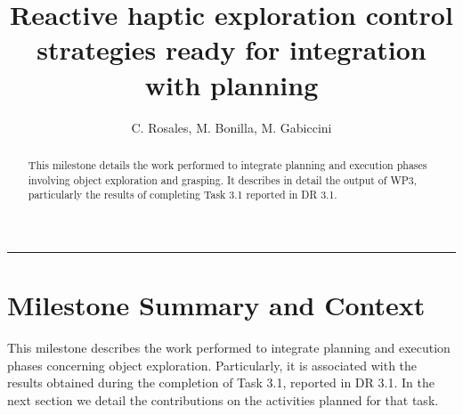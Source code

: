 \documentclass[a4paper,11pt,pdf]{pacmanreport}
\title{Reactive haptic exploration control strategies ready for integration with planning}
\author{C. Rosales, M. Bonilla, M. Gabiccini}
\begin{document}
\maketitle

\begin{abstract}
\noindent This milestone details the work performed to integrate planning and execution phases involving object exploration and grasping. It describes in detail the output of WP3, particularly the results of completing Task 3.1 reported in DR 3.1.
\end{abstract}


\vspace{.2em}
\hrule

\vspace{.2em}
\footnotesize

\tableofcontents

\normalsize

\newpage

\section{Milestone Summary and Context}

This milestone describes the work performed to integrate planning and execution phases concerning object exploration. Particularly, it is associated with the results obtained during the completion of Task 3.1, reported in DR 3.1. In the next section we detail the contributions on the activities planned for that task. 





\end{document}

